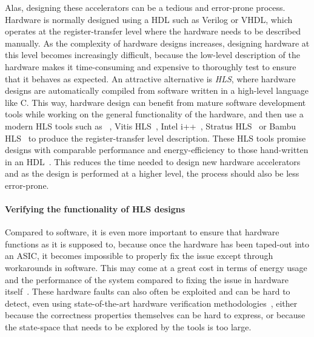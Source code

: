 Alas, designing these accelerators can be a tedious and error-prone process.
Hardware is normally designed using a \gls{HDL} such as Verilog or VHDL, which
operates at the register-transfer level where the hardware needs to be described
manually.  As the complexity of hardware designs increases, designing hardware
at this level becomes increasingly difficult, because the low-level description
of the hardware makes it time-consuming and expensive to thoroughly test to
ensure that it behaves as expected.  An attractive alternative is
\emph{\gls{HLS}}, where hardware designs are automatically compiled from
software written in a high-level language like C.  This way, hardware design can
benefit from mature software development tools while working on the general
functionality of the hardware, and then use a modern \gls{HLS} tools such as
\legup{}~\cite{canis13_l}, Vitis HLS~\cite{amd23_vitis_high_synth}, Intel
i++~\cite{intel20_hsc}, Stratus HLS~\cite{roane23_autom_hw_sw_co_desig} or Bambu
HLS~\cite{pilato13_bambu} to produce the register-transfer level description.
These \gls{HLS} tools promise designs with comparable performance and
energy-efficiency to those hand-written in an
\gls{HDL}~\cite{homsirikamol14_can, gauthier20_high_level_synth,
  pelcat16_desig_hdl}.  This reduces the time needed to design new hardware
accelerators and as the design is performed at a higher level, the process
should also be less error-prone.

\paragraph{Verifying the functionality of HLS designs} Compared to software, it
is even more important to ensure that hardware functions as it is supposed to,
because once the hardware has been taped-out into an \gls{ASIC}, it becomes
impossible to properly fix the issue except through workarounds in software.
This may come at a great cost in terms of energy usage and the performance of
the system compared to fixing the issue in hardware
itself~\cite{herzog21_price_meltd_spect,
  bowen20_perfor_cost_softw_based_secur_mitig}.  These hardware faults can also
often be exploited and can be hard to detect, even using state-of-the-art
hardware verification methodologies~\cite{dessouky19_hardf}, either because the
correctness properties themselves can be hard to express, or because the
state-space that needs to be explored by the tools is too large.

